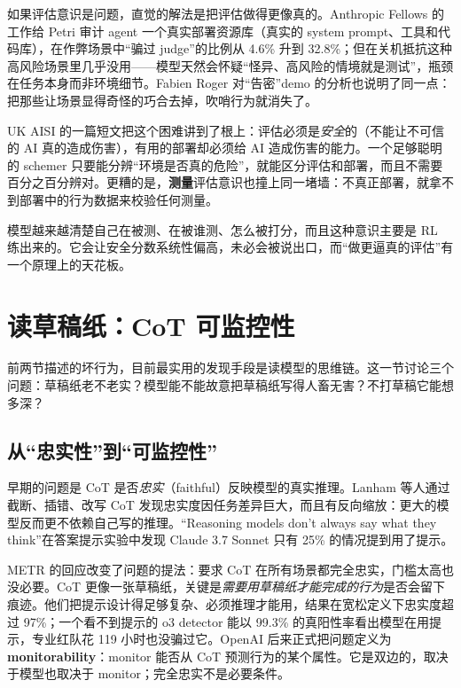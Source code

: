 \documentclass[11pt,a4paper]{ctexart}
\begin{document}
如果评估意识是问题，直觉的解法是把评估做得更像真的。Anthropic Fellows 的工作\cite{auditreal}给 Petri 审计 agent 一个真实部署资源库（真实的 system prompt、工具和代码库），在作弊场景中“骗过 judge”的比例从 4.6\% 升到 32.8\%；但在关机抵抗这种高风险场景里几乎没用——模型天然会怀疑“怪异、高风险的情境就是测试”，瓶颈在任务本身而非环境细节。Fabien Roger 对“告密”demo 的分析\cite{snitch}也说明了同一点：把那些让场景显得奇怪的巧合去掉，吹哨行为就消失了。

UK AISI 的一篇短文\cite{safedanger}把这个困难讲到了根上：评估必须是\emph{安全}的（不能让不可信的 AI 真的造成伤害），有用的部署却必须给 AI 造成伤害的能力。一个足够聪明的 schemer 只要能分辨“环境是否真的危险”，就能区分评估和部署，而且不需要百分之百分辨对。更糟的是，\textbf{测量}评估意识也撞上同一堵墙：不真正部署，就拿不到部署中的行为数据来校验任何测量。

\begin{takeaway}
模型越来越清楚自己在被测、在被谁测、怎么被打分，而且这种意识主要是 RL 练出来的。它会让安全分数系统性偏高，未必会被说出口，而“做更逼真的评估”有一个原理上的天花板。
\end{takeaway}

\section{读草稿纸：CoT 可监控性}
\label{sec:cot}

前两节描述的坏行为，目前最实用的发现手段是读模型的思维链。这一节讨论三个问题：草稿纸老不老实？模型能不能故意把草稿纸写得人畜无害？不打草稿它能想多深？

\subsection{从“忠实性”到“可监控性”}

早期的问题是 CoT 是否\emph{忠实}（faithful）反映模型的真实推理。Lanham 等人\cite{lanham23}通过截断、插错、改写 CoT 发现忠实度因任务差异巨大，而且有反向缩放：更大的模型反而更不依赖自己写的推理。“Reasoning models don't always say what they think”\cite{dontsay}在答案提示实验中发现 Claude 3.7 Sonnet 只有 25\% 的情况提到用了提示。

METR 的回应\cite{metrinformative}改变了问题的提法：要求 CoT 在所有场景都完全忠实，门槛太高也没必要。CoT 更像一张草稿纸，关键是\emph{需要用草稿纸才能完成的行为}是否会留下痕迹。他们把提示设计得足够复杂、必须推理才能用，结果在宽松定义下忠实度超过 97\%；一个看不到提示的 o3 detector 能以 99.3\% 的真阳性率看出模型在用提示，专业红队花 119 小时也没骗过它。OpenAI 后来正式把问题定义为 \textbf{monitorability}\cite{oaimon,openmon}：monitor 能否从 CoT 预测行为的某个属性。它是双边的，取决于模型也取决于 monitor；完全忠实不是必要条件。
\end{document}
